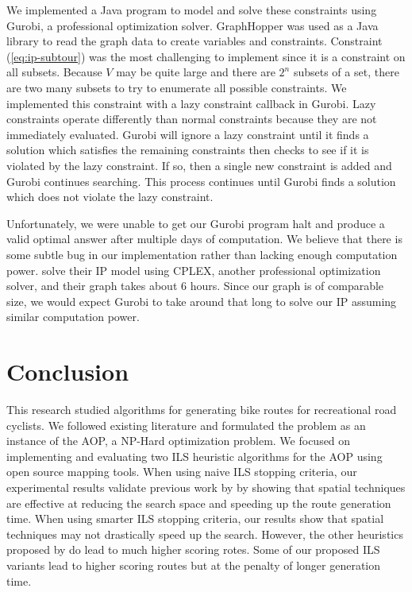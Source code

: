\documentclass[11pt]{article}
\begin{document}
We implemented a Java program to model and solve these constraints using Gurobi, a professional optimization solver. GraphHopper was used as a Java library to read the graph data to create variables and constraints. Constraint (\ref{eq:ip-subtour}) was the most challenging to implement since it is a constraint on all subsets. Because $V$ may be quite large and there are $2^n$ subsets of a set, there are two many subsets to try to enumerate all possible constraints. We implemented this constraint with a lazy constraint callback in Gurobi. Lazy constraints operate differently than normal constraints because they are not immediately evaluated. Gurobi will ignore a lazy constraint until it finds a solution which satisfies the remaining constraints then checks to see if it is violated by the lazy constraint. If so, then a single new constraint is added and Gurobi continues searching. This process continues until Gurobi finds a solution which does not violate the lazy constraint.

Unfortunately, we were unable to get our Gurobi program halt and produce a valid optimal answer after multiple days of computation. We believe that there is some subtle bug in our implementation rather than lacking enough computation power. \citeauthor{verbeeck2014extension} solve their IP model using CPLEX, another professional optimization solver, and their graph takes about 6 hours. Since our graph is of comparable size, we would expect Gurobi to take around that long to solve our IP assuming similar computation power.

\section{Conclusion}
This research studied algorithms for generating bike routes for recreational road cyclists. We followed existing literature and formulated the problem as an instance of the AOP, a NP-Hard optimization problem. We focused on implementing and evaluating two ILS heuristic algorithms \cite{verbeeck2014extension} \cite{lu2015arc} for the AOP using open source mapping tools. When using naive ILS stopping criteria, our experimental results validate previous work by \cite{lu2015arc} by showing that spatial techniques are effective at reducing the search space and speeding up the route generation time. When using smarter ILS stopping criteria, our results show that spatial techniques may not drastically speed up the search. However, the other heuristics proposed by \cite{lu2015arc} do lead to much higher scoring rotes. Some of our proposed ILS variants lead to higher scoring routes but at the penalty of longer generation time.
\end{document}
